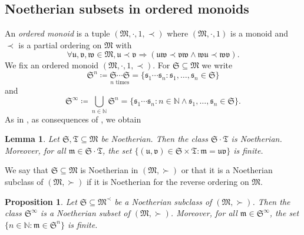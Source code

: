 \documentclass{article}
\newcommand{\assign}{\coloneqq}
\newcommand{\suchthat}{:}
\newcommand{\tmem}[1]{{\em #1\/}}
\newtheorem{proposition}[theorem]{Proposition}
\newtheorem{lemma}[theorem]{Lemma}
\theoremstyle{remark}\newtheorem*{convention*}{Convention}
\begin{document}
\subsection{Noetherian subsets in ordered monoids}

An {\tmem{ordered monoid}}{} is a tuple $(\mathfrak{M},
\cdot, 1, \prec)$ where $(\mathfrak{M}, \cdot, 1)$ is a monoid and $\prec$ is
a partial ordering on $\mathfrak{M}$ with
\begin{equation}
  \forall \mathfrak{u}, \mathfrak{v}, \mathfrak{w} \in \mathfrak{M},
  \mathfrak{u} \prec \mathfrak{v} \Longrightarrow (\mathfrak{u}\mathfrak{w}
  \prec \mathfrak{v}\mathfrak{w} \wedge \mathfrak{w}\mathfrak{u} \prec
  \mathfrak{w}\mathfrak{v}) . \label{eq-ordered-monoid}
\end{equation}
We fix an ordered monoid $(\mathfrak{M}, \cdot, 1, \prec)$. For $\mathfrak{S}
\subseteq \mathfrak{M}$ we write\label{autolab3}
\[ \mathfrak{S}^n \assign \underset{\text{$n$ times}}{\mathfrak{S} \cdots
   \mathfrak{S}} = \{ \mathfrak{s}_1 \cdots \mathfrak{s}_n \suchthat
   \mathfrak{s}_1, \ldots, \mathfrak{s}_n \in \mathfrak{S} \} \]
and
\[ \mathfrak{S}^{\infty} \assign \bigcup_{n \in \mathbb{N}} \mathfrak{S}^n =
   \{ \mathfrak{s}_1 \cdots \mathfrak{s}_n \suchthat n \in \mathbb{N} \wedge
   \mathfrak{s}_1, \ldots, \mathfrak{s}_n \in \mathfrak{S} \} . \]
As in {\cite{Hig52}}, as consequences of {\cite[Theorems~2.3 and 4.3]{Hig52}},
we obtain

\begin{lemma}
  \label{lem-Neumann-easy}{\tmem{{\cite{Hig52}}}} Let $\mathfrak{S},
  \mathfrak{T} \subseteq \mathfrak{M}$ be Noetherian. Then the class
  $\mathfrak{S} \cdot \mathfrak{T}$ is Noetherian. Moreover, for all
  $\mathfrak{m} \in \mathfrak{S} \cdot \mathfrak{T}$, the set $\{
  (\mathfrak{u}, \mathfrak{v}) \in \mathfrak{S} \times \mathfrak{T} \suchthat
  \mathfrak{m}=\mathfrak{u}\mathfrak{v} \}$ is finite.
\end{lemma}

We say that $\mathfrak{S} \subseteq \mathfrak{M}$ is Noetherian in
$(\mathfrak{M}, \succ)$ or that it is a Noetherian subclass of $(\mathfrak{M},
\succ)$ if it is Noetherian for the reverse ordering on $\mathfrak{M}$.

\begin{proposition}
  \label{prop-Neumann}Let $\mathfrak{S} \subseteq \mathfrak{M}^{\prec}$ be a
  Noetherian subclass of $(\mathfrak{M}, \succ)$. Then the class
  $\mathfrak{S}^{\infty}$ is a Noetherian subset of $(\mathfrak{M}, \succ)$.
  Moreover, for all $\mathfrak{m} \in \mathfrak{S}^{\infty}$, the set $\{ n
  \in \mathbb{N} \suchthat \mathfrak{m} \in \mathfrak{S}^n \}$ is finite.
\end{proposition}
\end{document}
